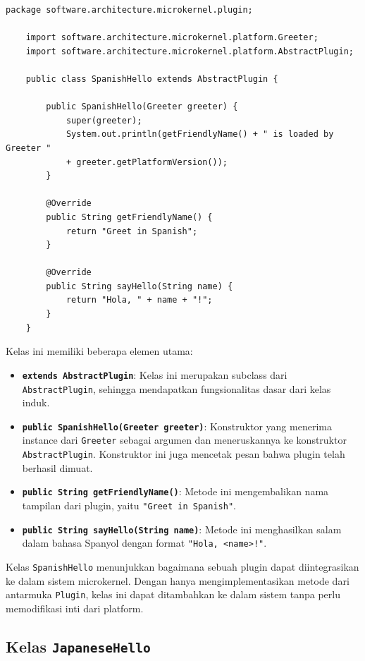 \begin{lstlisting}[style=JavaStyle, caption={Kelas \texttt{SpanishHello}}, label={lst:spanish-hello}]
	package software.architecture.microkernel.plugin;
	
	import software.architecture.microkernel.platform.Greeter;
	import software.architecture.microkernel.platform.AbstractPlugin;
	
	public class SpanishHello extends AbstractPlugin {
		
		public SpanishHello(Greeter greeter) {
			super(greeter);
			System.out.println(getFriendlyName() + " is loaded by Greeter " 
			+ greeter.getPlatformVersion());
		}
		
		@Override
		public String getFriendlyName() {
			return "Greet in Spanish";
		}
		
		@Override
		public String sayHello(String name) {
			return "Hola, " + name + "!";
		}
	}
\end{lstlisting}

\noindent
Kelas ini memiliki beberapa elemen utama:

\begin{itemize}
	\item \textbf{\texttt{extends AbstractPlugin}}: Kelas ini merupakan subclass dari \texttt{AbstractPlugin}, sehingga mendapatkan fungsionalitas dasar dari kelas induk.
	\item \textbf{\texttt{public SpanishHello(Greeter greeter)}}: Konstruktor yang menerima instance dari \texttt{Greeter} sebagai argumen dan meneruskannya ke konstruktor \texttt{AbstractPlugin}. Konstruktor ini juga mencetak pesan bahwa plugin telah berhasil dimuat.
	\item \textbf{\texttt{public String getFriendlyName()}}: Metode ini mengembalikan nama tampilan dari plugin, yaitu \texttt{"Greet in Spanish"}.
	\item \textbf{\texttt{public String sayHello(String name)}}: Metode ini menghasilkan salam dalam bahasa Spanyol dengan format \texttt{"Hola, <name>!"}.
\end{itemize}

Kelas \texttt{SpanishHello} menunjukkan bagaimana sebuah plugin dapat diintegrasikan ke dalam sistem microkernel. Dengan hanya mengimplementasikan metode dari antarmuka \texttt{Plugin}, kelas ini dapat ditambahkan ke dalam sistem tanpa perlu memodifikasi inti dari platform.

\subsection{Kelas \texttt{JapaneseHello}}

